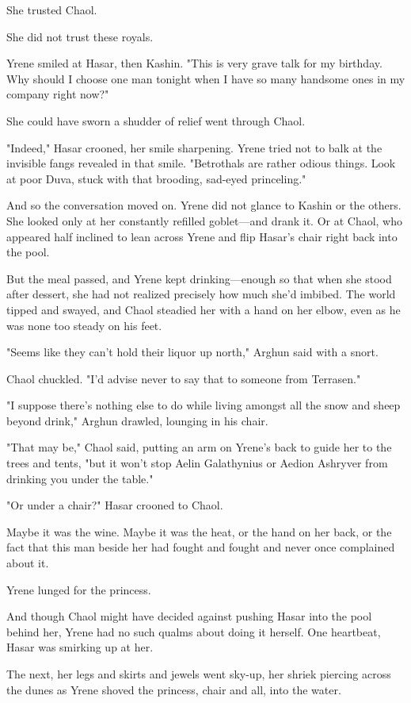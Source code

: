 She trusted Chaol.

She did not trust these royals.

Yrene smiled at Hasar, then Kashin. "This is very grave talk for my birthday. Why should I choose one man tonight when I have so many handsome ones in my company right now?"

She could have sworn a shudder of relief went through Chaol.

"Indeed," Hasar crooned, her smile sharpening. Yrene tried not to balk at the invisible fangs revealed in that smile. "Betrothals are rather odious things. Look at poor Duva, stuck with that brooding, sad-eyed princeling."

And so the conversation moved on. Yrene did not glance to Kashin or the others. She looked only at her constantly refilled goblet---and drank it. Or at Chaol, who appeared half inclined to lean across Yrene and flip Hasar's chair right back into the pool.

But the meal passed, and Yrene kept drinking---enough so that when she stood after dessert, she had not realized precisely how much she'd imbibed. The world tipped and swayed, and Chaol steadied her with a hand on her elbow, even as he was none too steady on his feet.

"Seems like they can't hold their liquor up north," Arghun said with a snort.

Chaol chuckled. "I'd advise never to say that to someone from Terrasen."

"I suppose there's nothing else to do while living amongst all the snow and sheep beyond drink," Arghun drawled, lounging in his chair.

"That may be," Chaol said, putting an arm on Yrene's back to guide her to the trees and tents, "but it won't stop Aelin Galathynius or Aedion Ashryver from drinking you under the table."

"Or under a chair?" Hasar crooned to Chaol.

Maybe it was the wine. Maybe it was the heat, or the hand on her back, or the fact that this man beside her had fought and fought and never once complained about it.

Yrene lunged for the princess.

And though Chaol might have decided against pushing Hasar into the pool behind her, Yrene had no such qualms about doing it herself. One heartbeat, Hasar was smirking up at her.

The next, her legs and skirts and jewels went sky-up, her shriek piercing across the dunes as Yrene shoved the princess, chair and all, into the water.

